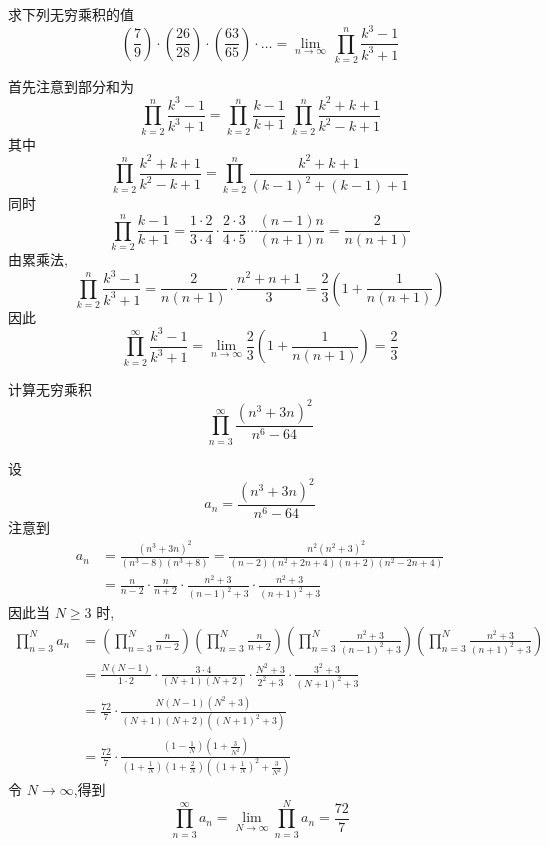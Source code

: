 \begin{questions}
    \question 求下列无穷乘积的值
    \[
    \left(\frac{7}{9}\right) \cdot \left(\frac{26}{28}\right) \cdot \left(\frac{63}{65}\right) \cdot \dots = \lim_{n \to \infty} \,\prod_{k=2}^{n} \frac{k^3 - 1}{k^3 + 1}
    \]
    \begin{solution}
        首先注意到部分和为
        \[
        \prod_{k=2}^{n} \frac{k^3 - 1}{k^3 + 1} = \prod_{k=2}^{n} \frac{k-1}{k+1} \;\prod_{k=2}^{n} \frac{k^2+k+1}{k^2-k+1}
        \]
        其中
        \[
        \prod_{k=2}^{n} \frac{k^2+k+1}{k^2-k+1} = \prod_{k=2}^{n} \frac{k^2+k+1}{(k-1)^2 + (k-1) + 1}
        \]
        同时
        \[
        \prod_{k=2}^{n} \frac{k-1}{k+1} = \frac{1\cdot 2}{3\cdot 4} \cdot \frac{2\cdot 3}{4\cdot 5} \cdots \frac{(n-1)n}{(n+1)n} = \frac{2}{n(n+1)}
        \]
        由累乘法,
        \[
        \prod_{k=2}^{n} \frac{k^3 - 1}{k^3 + 1} = \frac{2}{n(n+1)} \cdot \frac{n^2+n+1}{3} = \frac{2}{3} \left(1 + \frac{1}{n(n+1)}\right)
        \]
        因此
        \[
        \prod_{k=2}^{\infty} \frac{k^3 - 1}{k^3 + 1} = \lim_{n \to \infty} \frac{2}{3} \left(1 + \frac{1}{n(n+1)}\right) = \frac{2}{3}
        \]
    \end{solution}

    \question 计算无穷乘积
    \[
    \prod_{n=3}^\infty \frac{(n^3+3n)^2}{n^6-64}
    \]
    \begin{solution}
        设
        \[
        a_n=\frac{(n^3+3n)^2}{n^6-64}
        \]
        注意到
        \begin{align*}
        a_n
        &=\frac{(n^3+3n)^2}{(n^3-8)(n^3+8)}
        =\frac{n^2(n^2+3)^2}{(n-2)(n^2+2n+4)(n+2)(n^2-2n+4)} \\
        &=\frac{n}{n-2}\cdot\frac{n}{n+2}\cdot
        \frac{n^2+3}{(n-1)^2+3}\cdot
        \frac{n^2+3}{(n+1)^2+3}
        \end{align*}
        因此当 $N\ge3$ 时,
        \begin{align*}
        \prod_{n=3}^N a_n
        &=\left(\prod_{n=3}^N\frac{n}{n-2}\right)
        \left(\prod_{n=3}^N\frac{n}{n+2}\right)
        \left(\prod_{n=3}^N\frac{n^2+3}{(n-1)^2+3}\right)
        \left(\prod_{n=3}^N\frac{n^2+3}{(n+1)^2+3}\right) \\
        &=\frac{N(N-1)}{1\cdot2}\cdot
        \frac{3\cdot4}{(N+1)(N+2)}\cdot
        \frac{N^2+3}{2^2+3}\cdot
        \frac{3^2+3}{(N+1)^2+3} \\
        &=\frac{72}{7}\cdot
        \frac{N(N-1)(N^2+3)}{(N+1)(N+2)((N+1)^2+3)} \\
        &=\frac{72}{7}\cdot
        \frac{(1-\frac1N)(1+\frac{3}{N^2})}
        {(1+\frac1N)(1+\frac{2}{N})((1+\frac1N)^2+\frac{3}{N^2})}
        \end{align*}
        令 $N\to\infty$,得到
        \[
        \prod_{n=3}^\infty a_n
        =\lim_{N\to\infty}\prod_{n=3}^N a_n
        =\frac{72}{7}
        \]
    \end{solution}


\end{questions}
